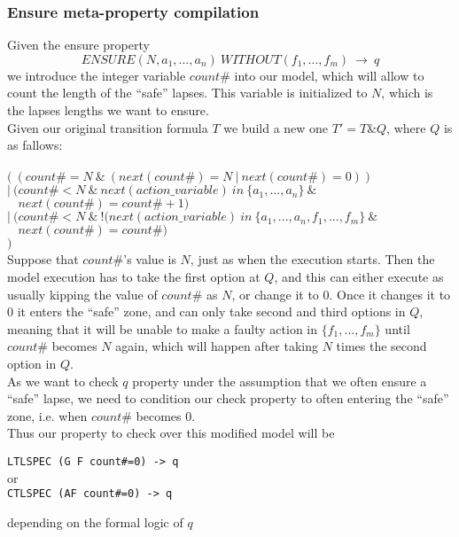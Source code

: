 \documentclass[12pt]{llncs2e/llncs}
\begin{document}
\subsubsection*{Ensure meta-property compilation}
Given the ensure property $$ENSURE(N,a_1,...,a_n)~WITHOUT(f_1,...,f_m)~\rightarrow~q$$
we introduce the integer variable $count\#$ into our model, which will allow to count the length of the ``safe'' lapses. This variable is initialized to $N$, which is the lapses lengths we want to ensure.\\
Given our original transition formula $T$ we build a new one $T' = T \& Q$, where $Q$ is as fallows:\\\\
$ (~(count\# = N~\&~(next(count\#)=N~|~next(count\#)=0))$\\
$ |~(count\# < N~\&~next(action\_variable)~in~\{a_1,...,a_n\}~\&$\\
$~~~~next(count\#)=count\#+1)$\\
$ |~(count\# < N~\&~!(next(action\_variable)~in~\{a_1,...,a_n,f_1,...,f_m\}~\&$\\
$~~~~next(count\#)=count\#)$\\
$ )$\\
Suppose that $count\#$'s value is $N$, just as when the execution starts. Then the model execution has to take the first option at $Q$, and this can either execute as usually kipping the value of $count\#$ as $N$, or change it to $0$. Once it changes it to $0$ it enters the ``safe'' zone, and can only take second and third options in $Q$, meaning that it will be unable to make a faulty action in $\{f_1,...,f_m\}$ until $count\#$ becomes $N$ again, which will happen after taking $N$ times the second option in $Q$.\\
As we want to check $q$ property under the assumption that we often ensure a ``safe'' lapse, we need to condition our check property to often entering the ``safe'' zone, i.e. when $count\#$ becomes $0$.\\
Thus our property to check over this modified model will be
\begin{center}
\texttt{LTLSPEC (G~F~count\#=0) -> q}\\
or\\
\texttt{CTLSPEC (AF~count\#=0) -> q}
\end{center}
depending on the formal logic of $q$
\end{document}
